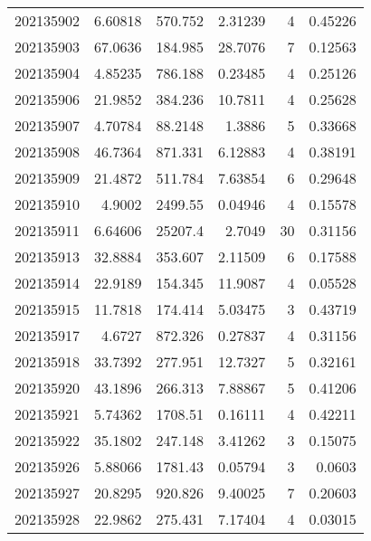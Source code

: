 \begin{tabular}{rrrrrr}
 202135902 &          6.60818 &      570.752  &            2.31239 &           4 & 0.45226 \\
 202135903 &         67.0636  &      184.985  &           28.7076  &           7 & 0.12563 \\
 202135904 &          4.85235 &      786.188  &            0.23485 &           4 & 0.25126 \\
 202135906 &         21.9852  &      384.236  &           10.7811  &           4 & 0.25628 \\
 202135907 &          4.70784 &       88.2148 &            1.3886  &           5 & 0.33668 \\
 202135908 &         46.7364  &      871.331  &            6.12883 &           4 & 0.38191 \\
 202135909 &         21.4872  &      511.784  &            7.63854 &           6 & 0.29648 \\
 202135910 &          4.9002  &     2499.55   &            0.04946 &           4 & 0.15578 \\
 202135911 &          6.64606 &    25207.4    &            2.7049  &          30 & 0.31156 \\
 202135913 &         32.8884  &      353.607  &            2.11509 &           6 & 0.17588 \\
 202135914 &         22.9189  &      154.345  &           11.9087  &           4 & 0.05528 \\
 202135915 &         11.7818  &      174.414  &            5.03475 &           3 & 0.43719 \\
 202135917 &          4.6727  &      872.326  &            0.27837 &           4 & 0.31156 \\
 202135918 &         33.7392  &      277.951  &           12.7327  &           5 & 0.32161 \\
 202135920 &         43.1896  &      266.313  &            7.88867 &           5 & 0.41206 \\
 202135921 &          5.74362 &     1708.51   &            0.16111 &           4 & 0.42211 \\
 202135922 &         35.1802  &      247.148  &            3.41262 &           3 & 0.15075 \\
 202135926 &          5.88066 &     1781.43   &            0.05794 &           3 & 0.0603  \\
 202135927 &         20.8295  &      920.826  &            9.40025 &           7 & 0.20603 \\
 202135928 &         22.9862  &      275.431  &            7.17404 &           4 & 0.03015 \\

\end{tabular}
